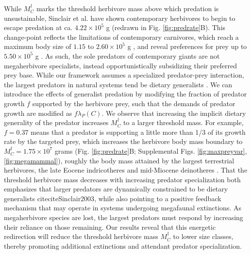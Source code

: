 \documentclass[11pt]{article}
\begin{document}
While $M_C^\dagger$ marks the threshold herbivore mass above which predation is unsustainable, Sinclair et al. \citep{Sinclair2003} have shown contemporary herbivores to begin to escape predation at ca. $4.22\times10^5$ g (redrawn in Fig. \ref{fig:predrate}B).
This change-point reflects the limitations of contemporary carnivores, which reach a maximum body size of $1.15$ to $2.60\times10^5$ g \citep{Sinclair2003,Hayward2005}, and reveal preferences for prey up to $5.50\times10^5$ g \citep{Hayward2005}.
As such, the sole predators of contemporary giants are not megaherbivore specialists, instead opportunistically subsidizing their preferred prey base. %
While our framework assumes a specialized predator-prey interaction, the largest predators in natural systems tend be dietary generalists \citep{Sinclair2003}.
We can introduce the effects of generalist predation by modifying the fraction of predator growth $f$ supported by the herbivore prey, such that the demands of predator growth are modified as $f\lambda_P(C)$.
We observe that increasing the implicit dietary generality of the predator increases $M_C^\dagger$ to a larger threshold mass.
For example, $f=0.37$ means that a predator is supporting a little more than 1/3 of its growth rate by the targeted prey, which increases the herbivore body mass boundary to $M_C^\dagger = 1.75\times10^7$ grams (Fig. \ref{fig:predrate}B; Supplemental Figs. \ref{fig:maxpreyvar},\ref{fig:megamammal}), roughly the body mass attained by the largest terrestrial herbivores, the late Eocene indricotheres and mid-Miocene deinotheres \citep{Smith:2010p3442,yeakel2018dynamics}.
That the threshold herbivore mass decreases with increasing predator specialization both emphasizes that larger predators are dynamically constrained to be dietary generalists citecite{Sinclair2003}, while also pointing to a positive feedback mechanism that may operate in systems undergoing megafaunal extinctions.
As megaherbivore species are lost, the largest predators must respond by increasing their reliance on those remaining.
Our results reveal that this energetic redirection will reduce the threshold herbivore mass $M_C^\dagger$ to lower size classes, thereby promoting additional extinctions and attendant predator specialization.
\end{document}
